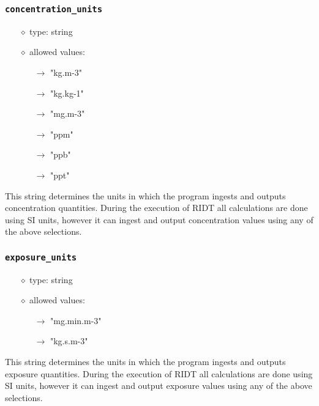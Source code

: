 \documentclass[]{article}
\def\code#1{\texttt{#1}}
\begin{document}
\subsubsection{\code{concentration\_units}}\label{sec:concentrationunits}
\begin{itemize}
    \item[$\diamond$] type: string 
    \item[$\diamond$] allowed values:
    \begin{itemize}
        \item[$\rightarrow$] "kg.m-3"
        \item[$\rightarrow$] "kg.kg-1"
        \item[$\rightarrow$] "mg.m-3"
        \item[$\rightarrow$] "ppm"
        \item[$\rightarrow$] "ppb"
        \item[$\rightarrow$] "ppt"
    \end{itemize}
\end{itemize}
This string determines the units in which the program ingests and outputs
concentration quantities. During the execution of RIDT all calculations are done
using SI units, however it can ingest and output concentration values using any
of the above selections.

\subsubsection{\code{exposure\_units}}\label{sec:exposureunits}
\begin{itemize}
    \item[$\diamond$] type: string 
    \item[$\diamond$] allowed values:
    \begin{itemize}
        \item[$\rightarrow$] "mg.min.m-3"
        \item[$\rightarrow$] "kg.s.m-3"
    \end{itemize}
\end{itemize}
This string determines the units in which the program ingests and outputs
exposure quantities. During the execution of RIDT all calculations are done
using SI units, however it can ingest and output exposure values using any
of the above selections.
\end{document}
